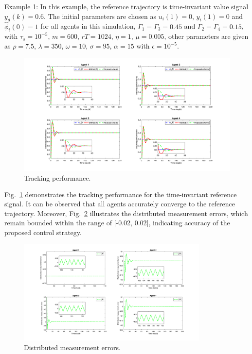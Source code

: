 \documentclass[journal,onecolumn]{IEEEtran}
\begin{document}
Example 1: In this example, the reference trajectory is time-invariant value signal $ y_d(k) = 0.6 $. The initial parameters are chosen as \(u_i(1)=0\), \(y_i(1)=0\) and \(\hat{\phi}_i(0)=1 \) for all agents in this simulation, \(\Gamma_{1}=\Gamma_{3}=0.45\) and \(\Gamma_{2}=\Gamma_{4}=0.15\), with \(\tau_s=10^{-5}\), \(m=600\), $rT = 1024 $, \(\eta=1\), \(\mu=0.005\), other parameters are given as \(\rho=7.5\), \(\lambda=350\), $ \omega = 10 $, $ \sigma=95 $, \(\alpha=15\) with \(\epsilon=10^{-5}\).
\begin{figure}[H]
    \centering
    \includegraphics[width=0.85 \textwidth]{inv_tracking.png}
    \caption{Tracking performance.}
    \label{fig:tracking_inv} %
\end{figure}


Fig.~\ref{fig:tracking_inv} demonstrates the tracking performance for the time-invariant reference signal. It can be observed that all agents accurately converge to the reference trajectory. Moreover, Fig.~\ref{fig:error_inv} illustrates the distributed measurement errors, which remain bounded within the range of [-0.02, 0.02], indicating accuracy of the proposed control strategy. 

\begin{figure}[H]
    \centering
    \includegraphics[width=0.85\textwidth]{inv_error.png}
    \caption{Distributed measurement errors.}
    \label{fig:error_inv} %
\end{figure}
\end{document}
